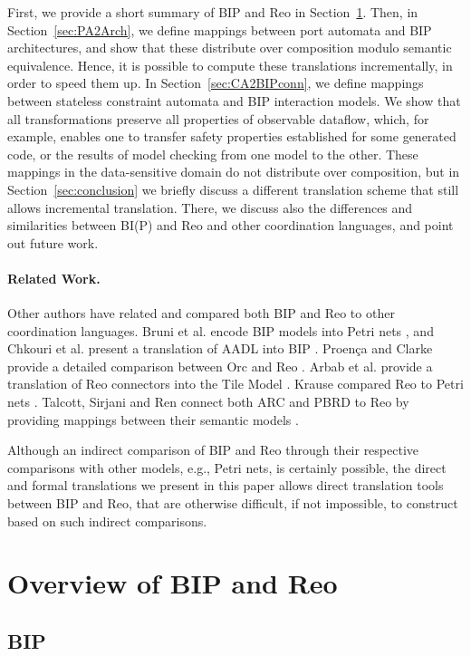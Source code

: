 \documentclass[submission,copyright,creativecommons,hidelinks]{eptcs}
\theoremstyle{plain} \newtheorem{theorem}{Theorem}
\theoremstyle{definition}
\theoremstyle{remark}
\newcommand{\secn}[1]{Section~\ref{sec:#1}}
\begin{document}
First, we provide a short summary of BIP and Reo in \secn{overview}.
Then, in \secn{PA2Arch}, we define mappings between port automata and BIP architectures, and show that these distribute over composition modulo semantic equivalence.
Hence, it is possible to compute these translations incrementally, in order to speed them up. 
In \secn{CA2BIPconn}, we define mappings between stateless constraint automata and BIP interaction models.
We show that all transformations preserve all properties of observable dataflow, which, for example, enables one to transfer safety properties established for some generated code, or the results of model checking from one model to the other. 
These mappings in the data-sensitive domain do not distribute over composition, but in \secn{conclusion} we briefly discuss a different translation scheme that still allows incremental translation. There, we discuss also the differences and similarities between BI(P) and Reo and other coordination languages, and point out future work.


\paragraph{Related Work.}
Other authors have related and compared both BIP and Reo to other coordination languages. 
Bruni et al. encode BIP models into Petri nets \cite{BMM11}, and Chkouri et al. present a translation of AADL into BIP \cite{CRB+08}. 
Proen\c{c}a and Clarke provide a detailed comparison between Orc and Reo \cite{PC08}.
Arbab et al. provide a translation of Reo connectors into the Tile Model \cite{ABCLM09}.
Krause compared Reo to Petri nets \cite{Krause09}.
Talcott, Sirjani and Ren connect both ARC and PBRD to Reo by providing mappings between their semantic models \cite{TSR11}.

Although an indirect comparison of BIP and Reo through their respective comparisons with other models, e.g., Petri nets, is certainly possible, the direct and formal translations we present in this paper allows direct translation tools between BIP and Reo, that are otherwise difficult, if not impossible, to construct based on such indirect comparisons.



\section{Overview of BIP and Reo}
\label{sec:overview} 

\subsection{BIP}
\label{sec:bip}
\end{document}

